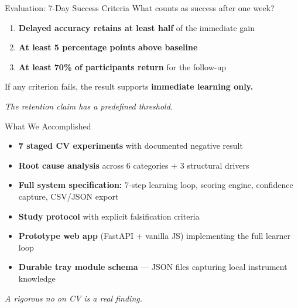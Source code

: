 \documentclass[10pt,aspectratio=169]{beamer}
\newcommand{\takeaway}[1]{%
  \vspace{0.25cm}
  \begin{center}\textit{\small #1}\end{center}
}
\begin{document}
\begin{frame}{Evaluation: 7-Day Success Criteria}
  \centering
  \vspace{0.6cm}
  {\large What counts as success after one week?}\\[0.8cm]
  \begin{enumerate}
    \item \textbf{Delayed accuracy retains at least half} of the immediate gain
    \vspace{0.5cm}
    \item \textbf{At least 5 percentage points above baseline}
    \vspace{0.5cm}
    \item \textbf{At least 70\% of participants return} for the follow-up
  \end{enumerate}
  \vspace{0.6cm}
  \begin{alertblock}{}
    \centering
    If any criterion fails, the result supports \textbf{immediate learning only.}
  \end{alertblock}
  \takeaway{The retention claim has a predefined threshold.}
\end{frame}

\begin{frame}{What We Accomplished}
  \vspace{0.2cm}
  \begin{itemize}
    \item[\textbf{--}] \textbf{7 staged CV experiments} with documented negative result

    \item[\textbf{--}] \textbf{Root cause analysis} across 6 categories + 3 structural drivers

    \item[\textbf{--}] \textbf{Full system specification:} 7-step learning loop, scoring engine, confidence capture, CSV/JSON export

    \item[\textbf{--}] \textbf{Study protocol} with explicit falsification criteria

    \item[\textbf{--}] \textbf{Prototype web app} (FastAPI + vanilla JS) implementing the full learner loop

    \item[\textbf{--}] \textbf{Durable tray module schema} --- JSON files capturing local instrument knowledge
  \end{itemize}
  \vspace{0.3cm}
  \takeaway{A rigorous no on CV is a real finding.}
\end{frame}
\end{document}
